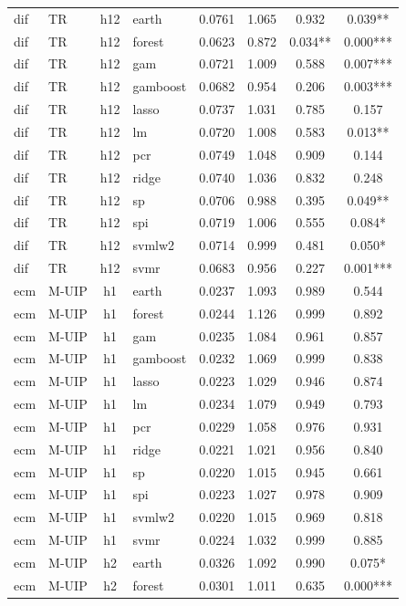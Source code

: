\begin{ThreePartTable}
\begin{longtable}[t]{llclcccc}
\addlinespace
dif & TR & h12 & earth & 0.0761 & 1.065 & 0.932 & 0.039**\\
dif & TR & h12 & forest & 0.0623 & 0.872 & 0.034** & 0.000***\\
dif & TR & h12 & gam & 0.0721 & 1.009 & 0.588 & 0.007***\\
dif & TR & h12 & gamboost & 0.0682 & 0.954 & 0.206 & 0.003***\\
dif & TR & h12 & lasso & 0.0737 & 1.031 & 0.785 & 0.157\\
dif & TR & h12 & lm & 0.0720 & 1.008 & 0.583 & 0.013**\\
dif & TR & h12 & pcr & 0.0749 & 1.048 & 0.909 & 0.144\\
dif & TR & h12 & ridge & 0.0740 & 1.036 & 0.832 & 0.248\\
dif & TR & h12 & sp & 0.0706 & 0.988 & 0.395 & 0.049**\\
dif & TR & h12 & spi & 0.0719 & 1.006 & 0.555 & 0.084*\\
dif & TR & h12 & svmlw2 & 0.0714 & 0.999 & 0.481 & 0.050*\\
dif & TR & h12 & svmr & 0.0683 & 0.956 & 0.227 & 0.001***\\
\addlinespace
ecm & M-UIP & h1 & earth & 0.0237 & 1.093 & 0.989 & 0.544\\
ecm & M-UIP & h1 & forest & 0.0244 & 1.126 & 0.999 & 0.892\\
ecm & M-UIP & h1 & gam & 0.0235 & 1.084 & 0.961 & 0.857\\
ecm & M-UIP & h1 & gamboost & 0.0232 & 1.069 & 0.999 & 0.838\\
ecm & M-UIP & h1 & lasso & 0.0223 & 1.029 & 0.946 & 0.874\\
ecm & M-UIP & h1 & lm & 0.0234 & 1.079 & 0.949 & 0.793\\
ecm & M-UIP & h1 & pcr & 0.0229 & 1.058 & 0.976 & 0.931\\
ecm & M-UIP & h1 & ridge & 0.0221 & 1.021 & 0.956 & 0.840\\
ecm & M-UIP & h1 & sp & 0.0220 & 1.015 & 0.945 & 0.661\\
ecm & M-UIP & h1 & spi & 0.0223 & 1.027 & 0.978 & 0.909\\
ecm & M-UIP & h1 & svmlw2 & 0.0220 & 1.015 & 0.969 & 0.818\\
ecm & M-UIP & h1 & svmr & 0.0224 & 1.032 & 0.999 & 0.885\\
\addlinespace
ecm & M-UIP & h2 & earth & 0.0326 & 1.092 & 0.990 & 0.075*\\
ecm & M-UIP & h2 & forest & 0.0301 & 1.011 & 0.635 & 0.000***\\

\end{longtable}
\end{ThreePartTable}
